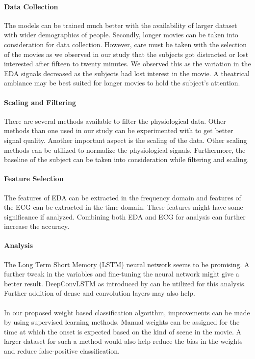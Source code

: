 \paragraph{Data Collection} The models can be trained much better with the availability of larger dataset with wider demographics of people. Secondly, longer movies can be taken into consideration for data collection. However, care must be taken with the selection of the movies as we observed in our study that the subjects got distracted or lost interested after fifteen to twenty minutes. We observed this as the variation in the EDA signals decreased as the subjects had lost interest in the movie. A theatrical ambiance may be best suited for longer movies to hold the subject's attention.

\paragraph{Scaling and Filtering} There are several methods available to filter the physiological data. Other methods than one used in our study can be experimented with to get better signal quality. Another important aspect is the scaling of the data. Other scaling methods can be utilized to normalize the physiological signals. Furthermore, the baseline of the subject can be taken into consideration while filtering and scaling.

\paragraph{Feature Selection} The features of EDA can be extracted in the frequency domain and features of the ECG can be extracted in the time domain. These features might have some significance if analyzed. Combining both EDA and ECG for analysis can further increase the accuracy. 

\paragraph{Analysis} The Long Term Short Memory (LSTM) neural network seems to be promising. A further tweak in the variables and fine-tuning the neural network might give a better result. DeepConvLSTM as introduced by \citeauthor{ordonez_deep_2016} can be utilized for this analysis. Further addition of dense and convolution layers may also help.

\paragraph{} In our proposed weight based classification algorithm, improvements can be made by using supervised learning methods. Manual weights can be assigned for the time at which the onset is expected based on the kind of scene in the movie. A larger dataset for such a method would also help reduce the bias in the weights and reduce false-positive classification.

